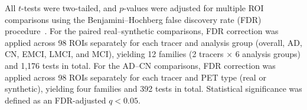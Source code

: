 All $t$-tests were two-tailed, and $p$-values were adjusted for multiple ROI comparisons using the Benjamini--Hochberg false discovery rate (FDR) procedure~\cite{benjamini1995controlling}. For the paired real--synthetic comparisons, FDR correction was applied across 98 ROIs separately for each tracer and analysis group (overall, AD, CN, EMCI, LMCI, and MCI), yielding 12 families (2 tracers $\times$ 6 analysis groups) and 1,176 tests in total. For the AD--CN comparisons, FDR correction was applied across 98 ROIs separately for each tracer and PET type (real or synthetic), yielding four families and 392 tests in total. Statistical significance was defined as an FDR-adjusted $q<0.05$.
